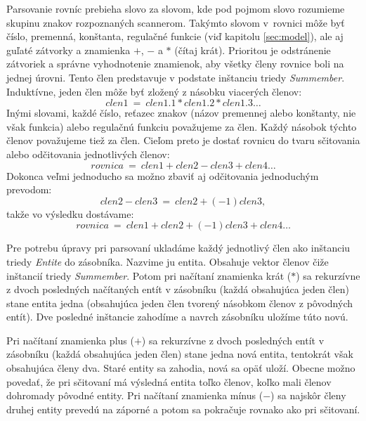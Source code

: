 \documentclass[11pt,final,oneside]{fithesis}
\begin{document}
Parsovanie rovn\'ic prebieha slovo za slovom, kde pod pojmom slovo rozumieme skupinu znakov rozpoznan\'ych scannerom. Tak\'ymto slovom v~rovnici m\^ o\v ze 
by\v t \v c\'islo, premenn\'a, kon\v stanta, regula\v cn\'e funkcie (vi\v d kapitolu \ref{sec:model}), ale aj gu\v lat\'e z\'atvorky a znamienka $+$, $-$ a
$*$ (\v c\'itaj kr\'at). Prioritou je odstr\'anenie z\'atvoriek a spr\'avne vyhodnotenie znamienok, aby v\v setky \v cleny rovnice boli na jednej \'urovni. 
Tento \v clen predstavuje v podstate in\v stanciu triedy {\it Summember}. Indukt\'ivne, jeden \v clen m\^ o\v ze by\v t zlo\v zen\'y z n\'asobku viacer\'ych 
\v clenov:
\begin{equation}
clen1 \ = \ clen1.1*clen1.2*clen1.3 \dots{}
\end{equation}
In\'ymi slovami, ka\v zd\'e \v c\'islo, re\v tazec znakov (n\'azov premennej alebo kon\v stanty, nie v\v sak funkcia) alebo regula\v cn\'u funkciu
pova\v zujeme za \v clen. Ka\v z\-d\'y n\'asobok t\'ychto \v clenov pova\v zujeme tie\v z za \v clen. Cie\v lom preto je dosta\v t rovnicu do tvaru 
s\v citovania alebo od\v citovania jednotliv\'ych \v clenov:
\begin{equation}
rovnica \ = \ clen1 + clen2 - clen3 + clen4 \dots{}
\end{equation} 
Dokonca ve\v lmi jednoducho sa mo\v zno zbavi\v t aj od\v citovania jednoduch\'ym prevodom:
\begin{equation}
clen2 - clen3 \ = \ clen2 + (-1)clen3,
\end{equation}
tak\v ze vo v\'ysledku dost\'avame:
\begin{equation}
rovnica \ = \ clen1 + clen2 + (-1)clen3 + clen4 \dots{}
\end{equation}

Pre potrebu \'upravy pri parsovan\'i uklad\'ame ka\v zd\'y jednotliv\'y \v clen ako in\v stanciu triedy {\it Entite} do z\'asobn\'ika. Nazvime ju entita.
Obsahuje vektor \v clenov \v ci\v ze in\v stanci\'i triedy {\it Summember}. Potom pri na\v c\'itan\'i znamienka kr\'at ($*$) sa rekurz\'ivne z dvoch 
posledn\'ych na\v c\'itan\'ych ent\'it v z\'asobn\'iku (ka\v z\-d\'a obsahuj\'uca jeden \v clen) stane entita jedna (obsahuj\'uca jeden \v clen tvoren\'y 
n\'asobkom \v clenov z p\^ ovodn\'ych ent\'it). Dve posledn\'e in\v stancie zahod\'ime a navrch z\'asobn\'iku ulo\v z\'ime t\'uto nov\'u.

Pri na\v c\'itan\'i znamienka plus ($+$) sa rekurz\'ivne z dvoch posledn\'ych ent\'it v z\'asobn\'iku (ka\v zd\'a obsahuj\'uca jeden \v clen) stane jedna nov\'a 
entita, tentokr\'at v\v sak obsahuj\'uca \v cleny dva. Star\'e entity sa zahodia, nov\'a sa op\"a\v t ulo\v z\'i. Obecne mo\v zno poveda\v t, \v ze pri 
s\v citovan\'i m\'a v\'ysledn\'a entita to\v lko \v clenov, ko\v lko mali \v clenov dohromady p\^ ovodn\'e entity. Pri na\v c\'itan\'i znamienka m\'inus ($-$) 
sa najsk\^ or \v cleny druhej entity preved\'u na z\'aporn\'e a potom sa pokra\v cuje rovnako ako pri s\v citovan\'i.
\end{document}

